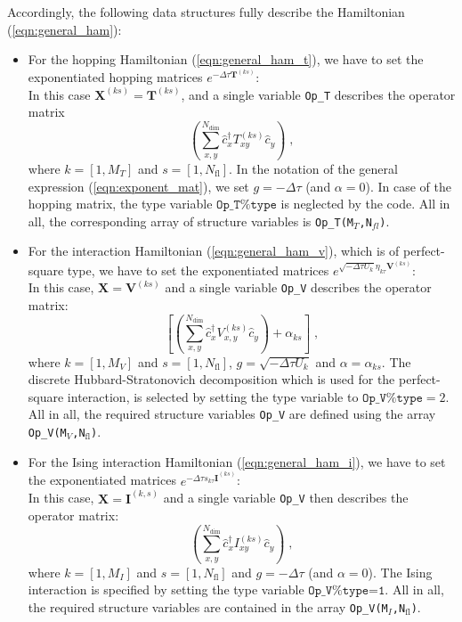 Accordingly, the following data structures fully describe the  Hamiltonian (\ref{eqn:general_ham}):
\begin{itemize}
\item For the hopping Hamiltonian (\ref{eqn:general_ham_t}), we have to set the exponentiated hopping matrices $ e^{-\Delta \tau {\bm T}^{(ks)}}$: \\
In this case $\bm{X}^{(ks)}=\bm{T}^{(ks)}$, and a single variable  \texttt{Op\_T}  describes the operator matrix
\begin{equation}
            \left( \sum_{x,y}^{N_{\mathrm{dim}}} \hat{c}^{\dagger}_x T_{xy}^{(ks)} \hat{c}^{\phantom{\dagger}}_{y}  \right)  \;,
\end{equation} 
where $k=[1, M_{T}]$ and $s=[1, N_{\mathrm{fl}}]$. In the notation of the general expression (\ref{eqn:exponent_mat}), we set $g=-\Delta \tau$ (and $\alpha = 0$).
In case of the hopping matrix, the type variable $\texttt{Op\_T\%type}$  is neglected by the code. 
All in all, the corresponding array of structure variables is  \texttt{Op\_T(M$_T$,N$_{fl}$)}.

\item For the interaction Hamiltonian (\ref{eqn:general_ham_v}), which is of perfect-square type, we have to set the exponentiated matrices $e^{  \sqrt{ -  \Delta \tau  U_k} \eta_{k\tau} {\bm V}^{(ks)} }$:\\
In this case, $\bm{X}  = \bm{V}^{(ks)}$ and a single variable  \texttt{Op\_V}  describes the operator matrix:
\begin{equation}
             \left[ \left( \sum_{x,y}^{N_{\mathrm{dim}}} \hat{c}^{\dagger}_x V_{x,y}^{(ks)} \hat{c}^{\phantom{\dagger}}_{y}  \right)  + \alpha_{ks} \right]  \;,
\end{equation} 
where $k=[1, M_{V}]$ and $s=[1, N_{\mathrm{fl}}]$, $g = \sqrt{-\Delta \tau  U_k}$ and  $\alpha = \alpha_{ks}$. 
The discrete Hubbard-Stratonovich decomposition which is used for the perfect-square interaction, is selected by setting the type variable to $\texttt{Op\_V\%type}=2$.
All in all, the required structure variables \texttt{Op\_V} are defined  using the array \texttt{Op\_V(M$_V$,N$_\mathrm{fl}$)}.


\item For the Ising interaction Hamiltonian (\ref{eqn:general_ham_i}), we have to set the exponentiated matrices $e^{  -\Delta \tau s_{k\tau}  {\bm I}^{(ks)}}$:\\
In this case, $\bm{X}  = \bm{I}^{(k,s)} $ and a single variable  \texttt{Op\_V} then  describes the operator matrix:
\begin{equation}
            \left( \sum_{x,y}^{N_{\mathrm{dim}}} \hat{c}^{\dagger}_x I_{xy}^{(ks)} \hat{c}^{\phantom{\dagger}}_{y}  \right)  \;,
\end{equation} 
where $k=[1, M_{I}]$ and $s=[1, N_{\mathrm{fl}}]$ and $g = -\Delta \tau$ (and $\alpha = 0$).
The Ising interaction is specified by setting the type variable  $\texttt{Op\_V\%type=1}$. 
All in all, the required structure variables are contained in the array \texttt{Op\_V(M$_{I}$,N$_\mathrm{fl}$)}.


\end{itemize}

